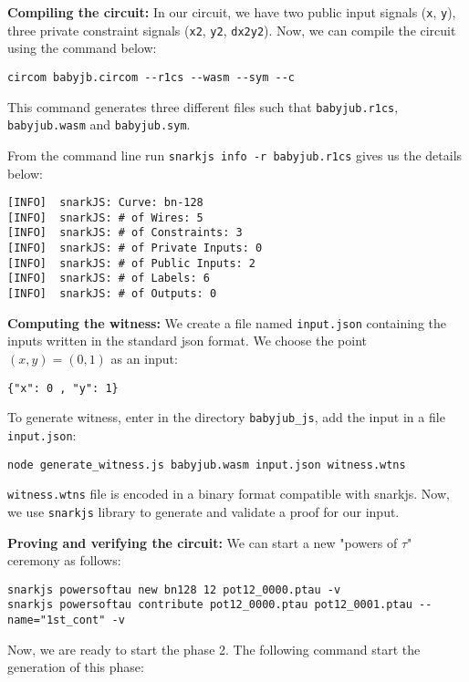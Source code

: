 \documentclass[a4paper,oneside,12pt]{book}
\begin{document}
\noindent \textbf{Compiling the circuit:} In our circuit, we have two public input signals (\verb|x|, \verb|y|), three private constraint signals (\verb|x2|, \verb|y2|, \verb|dx2y2|). Now, we can compile the circuit using the command below:

\begin{verbatim}
circom babyjb.circom --r1cs --wasm --sym --c
\end{verbatim}

\noindent This command generates three different files such that \verb|babyjub.r1cs|, \verb|babyjub.wasm| and \verb|babyjub.sym|.

\noindent From the command line run \verb|snarkjs info -r babyjub.r1cs| gives us the details below:

\begin{verbatim}
[INFO]  snarkJS: Curve: bn-128
[INFO]  snarkJS: # of Wires: 5
[INFO]  snarkJS: # of Constraints: 3
[INFO]  snarkJS: # of Private Inputs: 0
[INFO]  snarkJS: # of Public Inputs: 2
[INFO]  snarkJS: # of Labels: 6
[INFO]  snarkJS: # of Outputs: 0
\end{verbatim}

\noindent \textbf{Computing the witness:} We create a file named \verb|input.json| containing the inputs written in the standard json format. We choose the point $(x,y)=(0,1)$ as an input:

\begin{verbatim}
{"x": 0 , "y": 1}
\end{verbatim}

\noindent To generate witness, enter in the directory \verb|babyjub_js|, add the input in a file \verb|input.json|:

\begin{verbatim}
node generate_witness.js babyjub.wasm input.json witness.wtns
\end{verbatim}

\noindent \verb|witness.wtns| file is encoded in a binary format compatible with snarkjs. Now, we use \verb|snarkjs| library to generate and validate a proof for our input. 

\noindent \textbf{Proving and verifying the circuit:} We can start a new "powers of $\tau$" ceremony as follows:
\begin{verbatim}
snarkjs powersoftau new bn128 12 pot12_0000.ptau -v
snarkjs powersoftau contribute pot12_0000.ptau pot12_0001.ptau --name="1st_cont" -v
\end{verbatim}

\noindent Now, we are ready to start the phase 2. The following command start the generation of this phase:
\end{document}
